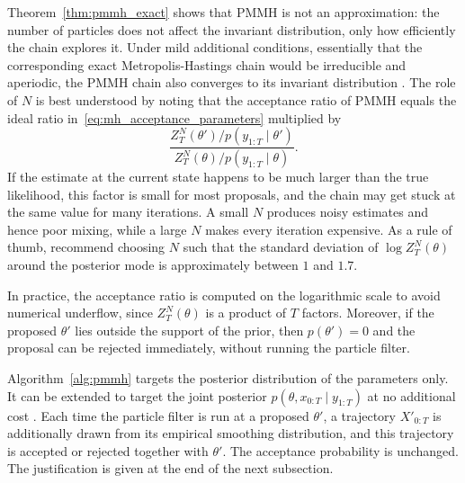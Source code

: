 Theorem~\ref{thm:pmmh_exact} shows that PMMH is not an approximation: the number of particles does not affect the invariant distribution, only how efficiently the chain explores it. Under mild additional conditions, essentially that the corresponding exact Metropolis-Hastings chain would be irreducible and aperiodic, the PMMH chain also converges to its invariant distribution \cite{andrieu2010particle}. The role of $N$ is best understood by noting that the acceptance ratio of PMMH equals the ideal ratio in~\eqref{eq:mh_acceptance_parameters} multiplied by
\begin{equation}
    \frac{Z_T^N(\theta')/p(y_{1:T}\mid\theta')}{Z_T^N(\theta)/p(y_{1:T}\mid\theta)}.
\end{equation}
If the estimate at the current state happens to be much larger than the true likelihood, this factor is small for most proposals, and the chain may get stuck at the same value for many iterations. A small $N$ produces noisy estimates and hence poor mixing, while a large $N$ makes every iteration expensive. As a rule of thumb, \cite{doucet2015efficient} recommend choosing $N$ such that the standard deviation of $\log Z_T^N(\theta)$ around the posterior mode is approximately between $1$ and $1.7$.

In practice, the acceptance ratio is computed on the logarithmic scale to avoid numerical underflow, since $Z_T^N(\theta)$ is a product of $T$ factors. Moreover, if the proposed $\theta'$ lies outside the support of the prior, then $p(\theta') = 0$ and the proposal can be rejected immediately, without running the particle filter.

\begin{remark}
    \label{rem:pmmh_trajectories}
    Algorithm~\ref{alg:pmmh} targets the posterior distribution of the parameters only. It can be extended to target the joint posterior $p(\theta,x_{0:T}\mid y_{1:T})$ at no additional cost \cite{andrieu2010particle}. Each time the particle filter is run at a proposed $\theta'$, a trajectory $X'_{0:T}$ is additionally drawn from its empirical smoothing distribution, and this trajectory is accepted or rejected together with $\theta'$. The acceptance probability is unchanged. The justification is given at the end of the next subsection.
\end{remark}

